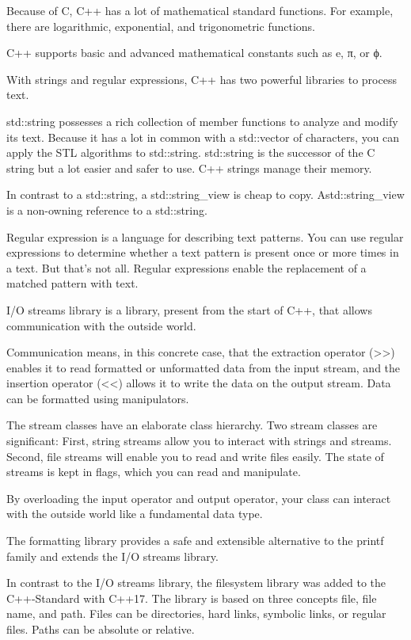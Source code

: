 Because of C, C++ has a lot of mathematical standard functions. For example, there are logarithmic, exponential, and trigonometric functions.

C++ supports basic and advanced mathematical constants such as e, π, or ϕ.


With strings and regular expressions, C++ has two powerful libraries to process text.

std::string possesses a rich collection of member functions to analyze and modify its text. Because it has a lot in common with a std::vector of characters, you can apply the STL algorithms to std::string. std::string is the successor of the C string but a lot easier and safer to use. C++ strings manage their memory.

In contrast to a std::string, a std::string\_view is cheap to copy. Astd::string\_view is a non-owning reference to a std::string.

Regular expression is a language for describing text patterns. You can use regular expressions to determine whether a text pattern is present once or more times in a text. But that’s not all. Regular expressions enable the replacement of a matched pattern with text.


I/O streams library is a library, present from the start of C++, that allows communication with the outside world.

Communication means, in this concrete case, that the extraction operator (>{}>) enables it to read formatted or unformatted data from the input stream, and the insertion operator (<{}<) allows it to write the data on the output stream. Data can be formatted using manipulators.

The stream classes have an elaborate class hierarchy. Two stream classes are significant: First, string streams allow you to interact with strings and streams. Second, file streams will enable you to read and write files easily. The state of streams is kept in flags, which you can read and manipulate.

By overloading the input operator and output operator, your class can interact with the outside world like a fundamental data type.

The formatting library provides a safe and extensible alternative to the printf family and extends the I/O streams library.

In contrast to the I/O streams library, the filesystem library was added to the C++-Standard with C++17. The library is based on three concepts file, file name, and path. Files can be directories, hard links, symbolic links, or regular files. Paths can be absolute or relative.

